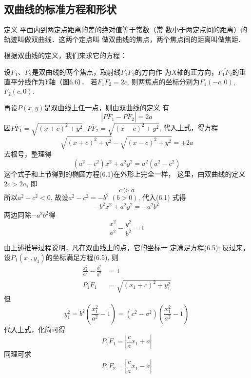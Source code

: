 \subsection{双曲线的标准方程和形状}
\begin{blk}
    {定义} 平面内到两定点距离的差的绝对值等于常数（常
数小于两定点间的距离）的轨迹叫做双曲线．这两个定点叫
做双曲线的焦点，两个焦点间的距离叫做焦距．
\end{blk}

根据双曲线的定义，我们来求它的方程：
\begin{figure}[htp]
    \centering
{}
    \caption{}
\end{figure}

设$F_1$、$F_2$是双曲线的两个焦点，取射线$F_1F_2$的方向作
为$X$轴的正方向，$\overline{F_1F_2}$的垂直平分线作为$Y$轴（图6.6）．
若$\overline{F_1F_2}=2c$, 则两焦点的坐标分别为$F_1(-c,0)$, $F_2
(c,0)$. 

再设$P(x,y)$是双曲线上任一点，则由双曲线的定义
有
\[|\overline{PF_1}-\overline{PF_2}|=2a\]
因$\overline{PF_1}=\sqrt{(x+c)^2+y^2}$, $\overline{PF_2}=
\sqrt{(x-c)^2+y^2}$, 
代入上式，得方程
\[\sqrt{(x+c)^2+y^2}-\sqrt{(x-c)^2+y^2}=\pm 2a\]
去根号，整理得
\begin{equation*}
    (a^2-c^2)x^2+a^2y^2=a^2(a^2-c^2)
\end{equation*}
这个式子和上节得到的椭圆方程(6.1)在外形上完全一样，
这里，由双曲线的定义$2c>2a$, 即
\[c>a\]
所以$a^2-c^2<0$, 故设$a^2-c^2=-b^2\; (b>0)$, 代入(6.1)
式得
\[-b^2x^2+a^2y^2=-a^2b^2\]
两边同除$-a^2b^2$得
\begin{equation}
    \boxed{\frac{x^2}{a^2}-\frac{y^2}{b^2}=1}
\end{equation}

由上述推导过程说明，凡在双曲线上的点，它的坐标一
定满足方程(6.5); 反过来，
设$P_1(x_1,y_1)$的坐标满足方程(6.5), 则
\[\begin{split}
    \frac{x^2_1}{a^2}-\frac{y^2_1}{b^2}&=1\\
    \overline{P_1F_1}&=\sqrt{(x_1+c)^2+y_1^2}
\end{split}\]
但
\[y^2_1=b^2\left(\frac{x_1^2}{a^2}-1\right)=(c^2-a^2)\left(\frac{x_1^2}{a^2}-1\right)\]
代入上式，化简可得
\begin{equation}
    \overline{P_1F_1}=\left|\frac{c}{a}x_1+a\right|
\end{equation}
同理可求
\begin{equation}
    \overline{P_1F_2}=\left|\frac{c}{a}x_1-a\right|
\end{equation}

